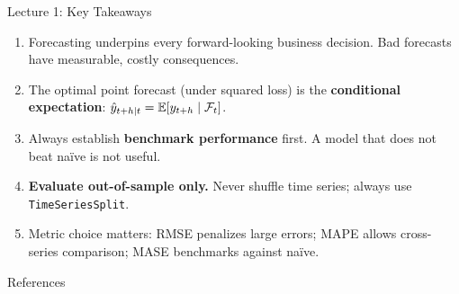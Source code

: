 \documentclass[aspectratio=169, 11pt]{beamer}
\begin{document}
\begin{frame}{Lecture 1: Key Takeaways}
  \begin{keybox}
    \small
    \begin{enumerate}
      \item Forecasting underpins every forward-looking business decision.
            Bad forecasts have measurable, costly consequences.

      \item The optimal point forecast (under squared loss) is the
            \textbf{conditional expectation}: $\hat{y}_{t+h|t} = \mathbb{E}[y_{t+h} \mid \mathcal{F}_t]$.

      \item Always establish \textbf{benchmark performance} first.
            A model that does not beat na\"{i}ve is not useful.

      \item \textbf{Evaluate out-of-sample only.}
            Never shuffle time series; always use \texttt{TimeSeriesSplit}.

      \item Metric choice matters: RMSE penalizes large errors;
            MAPE allows cross-series comparison; MASE benchmarks against na\"{i}ve.
    \end{enumerate}
  \end{keybox}
  \vspace{0.1cm}
\end{frame}

\begin{frame}[allowframebreaks]{References}
  \printbibliography[heading=none]
\end{frame}

\end{document}
